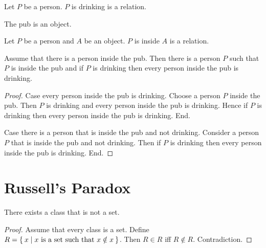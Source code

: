 \documentclass{article}
\begin{document}
  \begin{forthel}
    \begin{signature}
      Let $P$ be a person.
      $P$ is drinking is a relation.
    \end{signature}

    \begin{signature}
      The pub is an object.
    \end{signature}

    \begin{signature}
      Let $P$ be a person and $A$ be an object.
      $P$ is inside $A$ is a relation.
    \end{signature}

    \begin{theorem}
      Assume that there is a person inside the pub.
      Then there is a person $P$ such that $P$ is inside the pub and if $P$ is
      drinking then every person inside the pub is drinking.
    \end{theorem}
    \begin{proof}
      Case every person inside the pub is drinking.
        Choose a person $P$ inside the pub.
        Then $P$ is drinking and every person inside the pub is drinking.
        Hence if $P$ is drinking then every person inside the pub is drinking.
      End.

      Case there is a person that is inside the pub and not drinking.
        Consider a person $P$ that is inside the pub and not drinking.
        Then if $P$ is drinking then every person inside the pub is drinking.
      End.
    \end{proof}
  \end{forthel}


  \section*{Russell's Paradox}

  \begin{forthel}
    \begin{theorem}
      There exists a class that is not a set.
    \end{theorem}
    \begin{proof}
      Assume that every class is a set.
      Define $R = \Set{x | \text{$x$ is a set such that $x \notin x$}}$.
      Then $R \in R$ iff $R \notin R$.
      Contradiction.
    \end{proof}
  \end{forthel}
\end{document}
